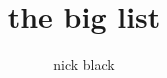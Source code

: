 \documentclass[ebook,10pt,openany,oneside]{memoir}
\title{the big list}
\author{nick black}
\begin{document}
\centering
\footnotesize

\end{document}
